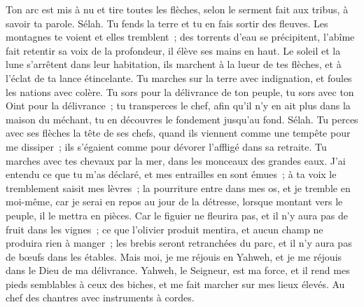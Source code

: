 \begin{multicols}{2}
Ton arc est mis à nu et tire toutes les flèches, selon le serment fait aux tribus, à savoir ta parole. Sélah. Tu fends la terre et tu en fais sortir des fleuves.
Les montagnes te voient et elles tremblent~; des torrents d'eau se précipitent, l'abîme fait retentir sa voix de la profondeur, il élève ses mains en haut.
Le soleil et la lune s'arrêtent dans leur habitation, ils marchent à la lueur de tes flèches, et à l'éclat de ta lance étincelante.
Tu marches sur la terre avec indignation, et foules les nations avec colère.
Tu sors pour la délivrance de ton peuple, tu sors avec ton Oint pour la délivrance~; tu transperces le chef, afin qu'il n'y en ait plus dans la maison du méchant, tu en découvres le fondement jusqu'au fond. Sélah.
Tu perces avec ses flèches la tête de ses chefs, quand ils viennent comme une tempête pour me dissiper~; ils s'égaient comme pour dévorer l'affligé dans sa retraite.
Tu marches avec tes chevaux par la mer, dans les monceaux des grandes eaux.
J'ai entendu ce que tu m'as déclaré, et mes entrailles en sont émues~; à ta voix le tremblement saisit mes lèvres~; la pourriture entre dans mes os, et je tremble en moi-même, car je serai en repos au jour de la détresse, lorsque montant vers le peuple, il le mettra en pièces.
Car le figuier ne fleurira pas, et il n'y aura pas de fruit dans les vignes~; ce que l'olivier produit mentira, et aucun champ ne produira rien à manger~; les brebis seront retranchées du parc, et il n'y aura pas de bœufs dans les étables.
Mais moi, je me réjouis en Yahweh, et je me réjouis dans le Dieu de ma délivrance.
Yahweh, le Seigneur, est ma force, et il rend mes pieds semblables à ceux des biches, et me fait marcher sur mes lieux élevés. Au chef des chantres avec instruments à cordes.
\PPE{}
\end{multicols}
